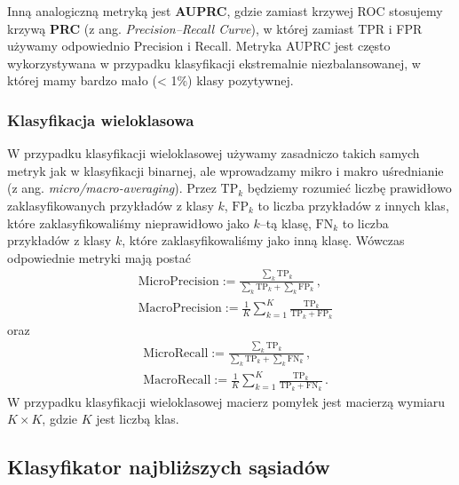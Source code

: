 \documentclass{myclass}
\numberwithin{equation}{subsection}
\begin{document}
Inną analogiczną metryką jest \textbf{AUPRC}, gdzie zamiast krzywej ROC stosujemy krzywą
\textbf{PRC} (z ang. \textit{Precision--Recall Curve}), w której zamiast TPR i FPR używamy
odpowiednio Precision i Recall. Metryka AUPRC jest często wykorzystywana w przypadku klasyfikacji
ekstremalnie niezbalansowanej, w której mamy bardzo mało (< 1\%) klasy pozytywnej.


\subsubsection{Klasyfikacja wieloklasowa}

W przypadku klasyfikacji wieloklasowej używamy zasadniczo takich samych metryk jak w klasyfikacji
binarnej, ale wprowadzamy mikro i makro uśrednianie (z ang. \textit{micro/macro-averaging}). Przez
\(\mathrm{TP}_k\) będziemy rozumieć liczbę prawidłowo zaklasyfikowanych przykładów z klasy \(k\),
\(\mathrm{FP}_k\) to liczba przykładów z innych klas, które zaklasyfikowaliśmy nieprawidłowo jako
\(k\)--tą klasę, \(\mathrm{FN}_k\) to liczba przykładów z klasy \(k\), które zaklasyfikowaliśmy jako
inną klasę. Wówczas odpowiednie metryki mają postać
\begin{equation}
    \begin{split}
        &\mathrm{MicroPrecision} := \frac{\sum_{k} \mathrm{TP}_k}{\sum_{k} \mathrm{TP}_k + \sum_{k} \mathrm{FP}_k}\,,\\
        &\mathrm{MacroPrecision} := \frac{1}{K} \sum_{k=1}^K \frac{\mathrm{TP}_k}{\mathrm{TP}_k + \mathrm{FP}_k}
    \end{split}
\end{equation}
oraz
\begin{equation}
    \begin{split}
        &\mathrm{MicroRecall} := \frac{\sum_{k} \mathrm{TP}_k}{\sum_{k} \mathrm{TP}_k + \sum_{k} \mathrm{FN}_k}\,,\\
        &\mathrm{MacroRecall} := \frac{1}{K} \sum_{k=1}^K \frac{\mathrm{TP}_k}{\mathrm{TP}_k + \mathrm{FN}_k}\,.
    \end{split}
\end{equation}
W przypadku klasyfikacji wieloklasowej macierz pomyłek jest macierzą wymiaru \(K \times K\), gdzie
\(K\) jest liczbą klas.


\subsection{Klasyfikator najbliższych sąsiadów}
\end{document}
